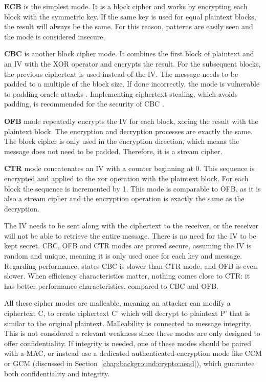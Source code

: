 \textbf{\ac{ECB}} is the simplest mode. It is a block cipher and works by encrypting each block with the symmetric key. If the same key is used for equal plaintext blocks, the result will always be the same. For this reason, patterns are easily seen and the mode is considered insecure.

\textbf{\ac{CBC}} is another block cipher mode. It combines the first block of plaintext and an \ac{IV} with the XOR operator and encrypts the result. For the subsequent blocks, the previous ciphertext is used instead of the IV. The message needs to be padded to a multiple of the block size. If done incorrectly, the mode is vulnerable to padding oracle attacks \cite{paddingoracle}. Implementing ciphertext stealing, which avoids padding, is recommended for the security of \ac{CBC} \cite{ciphertextstealing}.

\textbf{\ac{OFB}} mode repeatedly encrypts the IV for each block, xoring the result with the plaintext block. The encryption and decryption processes are exactly the same.
The block cipher is only used in the encryption direction, which means the message does not need to be padded. Therefore, it is a stream cipher.

\textbf{\ac{CTR}} mode concatenates an IV with a counter beginning at 0. This sequence is encrypted and applied to the xor operation with the plaintext block. For each block the sequence is incremented by 1.
This mode is comparable to \ac{OFB}, as it is also a stream cipher and the encryption operation is exactly the same as the decryption. 

The \ac{IV} needs to be sent along with the ciphertext to the receiver, or the receiver will not be able to retrieve the entire message. There is no need for the IV to be kept secret.
\ac{CBC}, \ac{OFB} and \ac{CTR} modes are proved secure, assuming the \ac{IV} is random and unique, meaning it is only used once for each key and message.
Regarding performance, \cite{aesmodes} states \ac{CBC} is slower than \ac{CTR} mode, and \ac{OFB} is even slower.
When efficiency characteristics matter, nothing comes close to \ac{CTR}: it has better performance characteristics, compared to \ac{CBC} and \ac{OFB}.

All these cipher modes are malleable, meaning an attacker can modify a ciphertext C, to create ciphertext C' which will decrypt to plaintext P' that is similar to the original plaintext. Malleability is connected to message integrity. This is not considered a relevant weakness since these modes are only designed to offer confidentiality. If integrity is needed, one of these modes should be paired with a \ac{MAC}, or instead use a dedicated authenticated-encryption mode like \ac{CCM} or \ac{GCM} (discussed in Section~\ref{chap:background:crypto:aead}), which guarantee both confidentiality and integrity.


